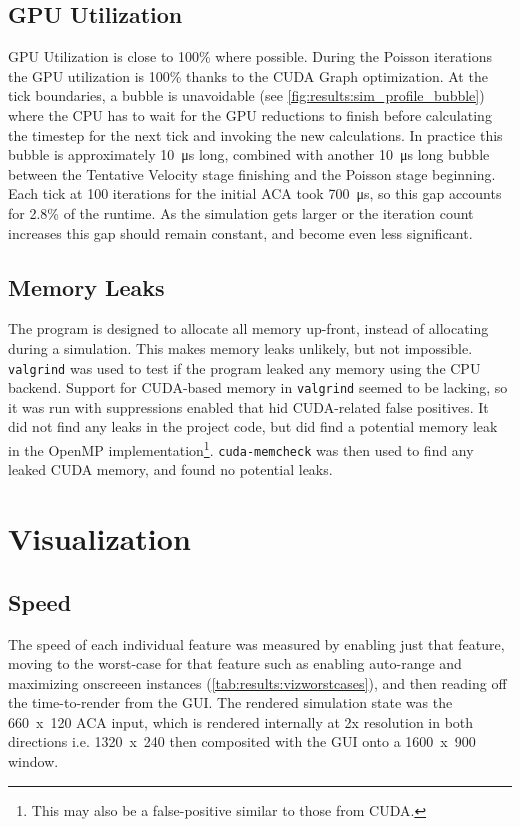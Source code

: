 \subsection{GPU Utilization}\label{sec:Results:Sim:Efficiency}

GPU Utilization is close to 100\% where possible.
During the Poisson iterations the GPU utilization is 100\% thanks to the CUDA Graph optimization.
At the tick boundaries, a bubble is unavoidable (see \cref{fig:results:sim_profile_bubble}) where the CPU has to wait for the GPU reductions to finish before calculating the timestep for the next tick and invoking the new calculations.
In practice this bubble is approximately \SI{10}{\micro\second} long, combined with another \SI{10}{\micro\second} long bubble between the Tentative Velocity stage finishing and the Poisson stage beginning.
Each tick at 100 iterations for the initial ACA took \SI{700}{\micro\second}, so this gap accounts for 2.8\% of the runtime.
As the simulation gets larger or the iteration count increases this gap should remain constant, and become even less significant.

\subsection{Memory Leaks}\label{sec:Results:Sim:Mem}
The program is designed to allocate all memory up-front, instead of allocating during a simulation.
This makes memory leaks unlikely, but not impossible.
\texttt{valgrind} was used to test if the program leaked any memory using the CPU backend.
Support for CUDA-based memory in \texttt{valgrind} seemed to be lacking, so it was run with suppressions enabled that hid CUDA-related false positives.
It did not find any leaks in the project code, but did find a potential memory leak in the OpenMP implementation\footnote{This may also be a false-positive similar to those from CUDA.}.
\texttt{cuda-memcheck} was then used to find any leaked CUDA memory, and found no potential leaks.

\section{Visualization}
\subsection{Speed}\label{sec:Results:Viz:Speed}
The speed of each individual feature was measured by enabling just that feature, moving to the worst-case for that feature such as enabling auto-range and maximizing onscreeen instances (\cref{tab:results:vizworstcases}), and then reading off the time-to-render from the GUI.
The rendered simulation state was the 660~x~120 ACA input, which is rendered internally at 2x resolution in both directions i.e. 1320~x~240 then composited with the GUI onto a 1600~x~900 window.

